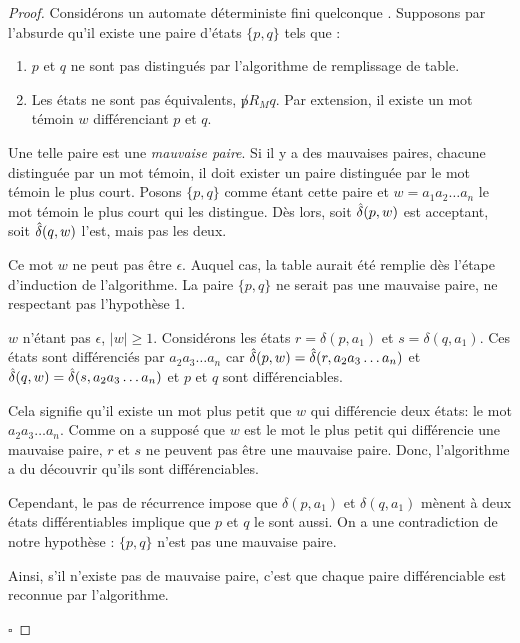 \begin{proof}

Considérons un automate déterministe fini quelconque \automaton. Supposons par l'absurde qu'il existe une paire d'états $\{p,q\}$ tels que :
\begin{enumerate}
	 \item $p$ et $q$ ne sont pas distingués par l'algorithme de remplissage de table.
	 \item Les états ne sont pas équivalents, $\not pR_M q$. Par extension, il existe un mot témoin $w$ différenciant $p$ et $q$.
\end{enumerate}

Une telle paire est une \emph{mauvaise paire}. Si il y a des mauvaises paires, chacune distinguée par un mot témoin, il doit exister un paire distinguée par le mot témoin le plus court. Posons $\{p,q\}$ comme étant cette paire et $w=a_1a_2\dots a_n$ le mot témoin le plus court qui les distingue. Dès lors, soit $\hat{\delta}(p,w)$ est acceptant, soit $\hat{\delta}(q,w)$ l'est, mais pas les deux.

Ce mot $w$ ne peut pas être $\epsilon$. Auquel cas, la table aurait été remplie dès l'étape d'induction de l'algorithme. La paire $\{p,q\}$ ne serait pas une mauvaise paire, ne respectant pas l'hypothèse 1.

$w$ n'étant pas $\epsilon$, $ |w| \ge 1$. Considérons les états $r = \delta(p,a_1)$ et $s=\delta(q,a_1)$. Ces états sont différenciés par $a_2a_3\dots a_n$ car $\hat{\delta}(p,w) = \hat{\delta}(r, a_2a_3\dots a_n)$ et $\hat{\delta}(q,w) = \hat{\delta}(s, a_2a_3\dots a_n)$ et $p$ et $q$ sont différenciables.

Cela signifie qu'il existe un mot plus petit que $w$ qui différencie deux états: le mot $a_2a_3\dots a_n$. Comme on a supposé que $w$ est le mot le plus petit qui différencie une mauvaise paire, $r$ et $s$ ne peuvent pas être une mauvaise paire. Donc, l'algorithme a du découvrir qu'ils sont différenciables.

Cependant, le pas de récurrence impose que $\delta(p, a_1)$ et $\delta(q, a_1)$ mènent à deux états différentiables implique que $p$ et $q$ le sont aussi. On a une contradiction de notre hypothèse : $\{p,q\}$ n'est pas une mauvaise paire.

Ainsi, s'il n'existe pas de mauvaise paire, c'est que chaque paire différenciable est reconnue par l'algorithme.

\hfill$\square$
\end{proof}

